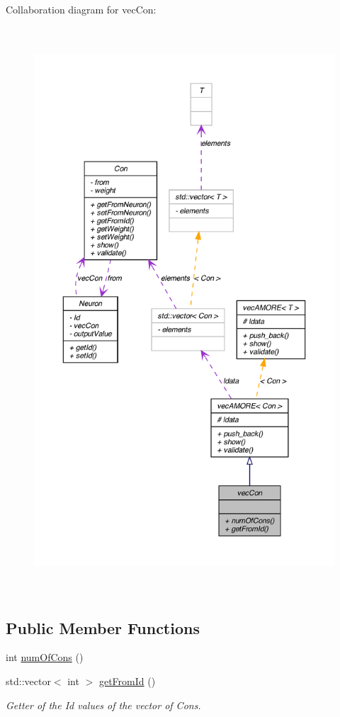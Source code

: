 Collaboration diagram for vecCon:
\nopagebreak
\begin{figure}[H]
\begin{center}
\leavevmode
\includegraphics[height=600pt]{classvec_con__coll__graph}
\end{center}
\end{figure}
\subsection*{Public Member Functions}
\begin{DoxyCompactItemize}
\item 
int \hyperlink{classvec_con_a1e39a5e78c40ae8af9bbd2fd7f0dc749}{numOfCons} ()
\item 
std::vector$<$ int $>$ \hyperlink{classvec_con_aa9f3f5df4c4060951c975c4c829b8471}{getFromId} ()
\begin{DoxyCompactList}\small\item\em Getter of the Id values of the vector of Cons. \end{DoxyCompactList}\end{DoxyCompactItemize}


